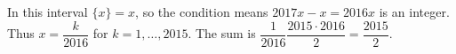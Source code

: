 In this interval $\{x\}=x $, so the condition means $ 2017x-x=2016x $ is an integer. Thus $ x=\dfrac{k}{2016}$ for $ k=1,\ldots,2015 $. The sum is $\dfrac{1}{2016}\dfrac{2015\cdot2016}{2}=\boxed{\dfrac{2015}{2}}$.
